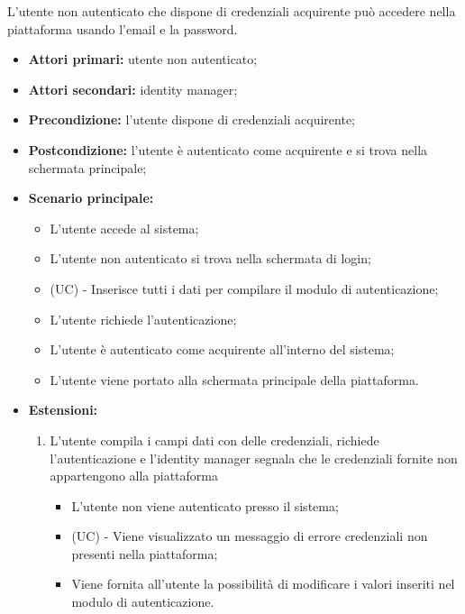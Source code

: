 L'utente non autenticato che dispone di credenziali acquirente può accedere nella piattaforma usando l'email e la password.
\begin{itemize}
	\item \textbf{Attori primari:} utente non autenticato;
	\item \textbf{Attori secondari:} identity manager;
	\item \textbf{Precondizione:} l'utente dispone di credenziali acquirente;
	\item \textbf{Postcondizione:} l'utente è autenticato come acquirente e si trova nella schermata principale;
	\item \textbf{Scenario principale:}
	\begin{itemize}
		\item L'utente accede al sistema;
		\item L'utente non autenticato si trova nella schermata di login;
		\item (UC) - Inserisce tutti i dati per compilare il modulo di autenticazione; %
		\item L'utente richiede l'autenticazione;
		\item L'utente è autenticato come acquirente all'interno del sistema;
		\item L'utente viene portato alla schermata principale della piattaforma.
	\end{itemize}
	\item \textbf{Estensioni:}
	\begin{enumerate}
		\item L'utente compila i campi dati con delle credenziali, richiede l'autenticazione e l'identity manager segnala che le credenziali fornite non appartengono alla piattaforma
		\begin{itemize}
			\item L'utente non viene autenticato presso il sistema;
			\item (UC) - Viene visualizzato un messaggio di errore credenziali non presenti nella piattaforma;
			\item Viene fornita all'utente la possibilità di modificare i valori inseriti nel modulo di autenticazione.
		\end{itemize}
	\end{enumerate} 
\end{itemize}


